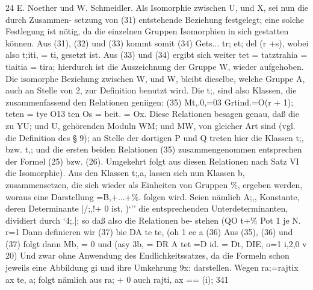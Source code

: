 \documentclass[11pt,a4paper]{article}
\theoremstyle{plain}
\theoremstyle{definition}
\begin{document}
24 
E. Noether und W. Schmeidler. 
Als Isomorphie zwischen U, und X, sei nun die durch Zusammen- 
setzung von (31) entstehende Beziehung festgelegt; eine solche Festlegung 
ist nötig, da die einzelnen Gruppen Isomorphien in sich gestatten können. 
Aus (31), (32) und (33) kommt somit 
(34) 
Gets... tr; et; del 
(r +s), 
wobei also t;iti, = ti, gesetzt ist. Aus (33) und (34) ergibt sich weiter 
tet = tatztrahia = tiaitia = tira; 
hierdurch 
ist die Auszeichnung der Gruppe W, wieder aufgehoben. 
Die 
isomorphe Beziehung zwischen W, und W, bleibt dieselbe, 
welche Gruppe 
A, auch an Stelle von 2, zur Definition benutzt wird. 
Die t;, sind also 
Klassen, die zusammenfassend den Relationen geniigen: 
(35) Mt,.0,=03 Grtind.=O(r + 1); teten = tye O13 ten Os = beit. = Ox. 
Diese Relationen besagen genau, daß die zu YU; und U, gehörenden 
Moduln WM; und MW, von gleicher Art sind (vgl. die Definition des \S{} 9); 
an Stelle 
der dortigen P und Q treten hier die Klassen t;, bzw. t,; und 
die ersten beiden Relationen 
(35) zusammengenommen 
entsprechen 
der 
Formel 
(25) bzw. (26). 
Umgekehrt 
folgt aus 
diesen Relationen nach 
Satz VI die Isomorphie\textdegree{}). 
Aus den Klassen 
t;,a, lassen sich nun Klassen b, zusammensetzen, 
die sich wieder als Einheiten von Gruppen \%, ergeben werden, woraus 
eine 
Darstellung 
 =B,+...+\%. 
folgen 
wird. 
Seien 
nämlich 
A;,, Konstante, deren Determinante |/;,!+ 0 ist, )`'' die entsprechenden 
Unterdeterminanten, dividiert durch `4;.|; so daß also die Relationen be- 
stehen 
(QO 
t+\% 
Pot 
1 je 
N. 
r=1 
Dann definieren wir 
(37) 
bie DA te te, 
(oh 1 ee a 
(36) 
Aus (35), (36) und (37) folgt dann Mb, = 0 und 
(asy 
3b, = DR 
A tet =D id. 
= Dt, DIE, 
o=1 
i,2,0 
v 
20) Und zwar ohne Anwendung des Endlichkeitssatzes, da die Formeln schon jeweils 
eine Abbildung gi und ihre Umkehrung 9x: darstellen. 
Wegen ra;=rajtix 
ax te, 
a; 
folgt nämlich aus ra; + 0 auch rajti, ax == (i); 
341
\end{document}

